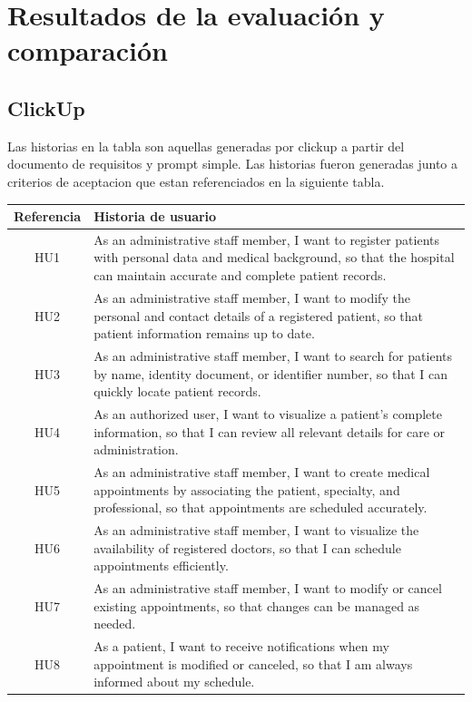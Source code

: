 \section{Resultados de la evaluación y comparación}

\subsection{ClickUp}

Las historias en la tabla son aquellas generadas por clickup a partir del documento de requisitos y prompt simple. Las historias fueron generadas junto a criterios de aceptacion que estan referenciados en la siguiente tabla.

\begin{longtable}{|c|p{12cm}|}
\hline
\textbf{Referencia} & \textbf{Historia de usuario} \\
\hline
HU1 & As an administrative staff member, I want to register patients with personal data and medical background, so that the hospital can maintain accurate and complete patient records. \\
\hline
HU2 & As an administrative staff member, I want to modify the personal and contact details of a registered patient, so that patient information remains up to date. \\
\hline
HU3 & As an administrative staff member, I want to search for patients by name, identity document, or identifier number, so that I can quickly locate patient records. \\
\hline
HU4 & As an authorized user, I want to visualize a patient's complete information, so that I can review all relevant details for care or administration. \\
\hline
HU5 & As an administrative staff member, I want to create medical appointments by associating the patient, specialty, and professional, so that appointments are scheduled accurately. \\
\hline
HU6 & As an administrative staff member, I want to visualize the availability of registered doctors, so that I can schedule appointments efficiently. \\
\hline
HU7 & As an administrative staff member, I want to modify or cancel existing appointments, so that changes can be managed as needed. \\
\hline
HU8 & As a patient, I want to receive notifications when my appointment is modified or canceled, so that I am always informed about my schedule. \\
\hline

\end{longtable}
